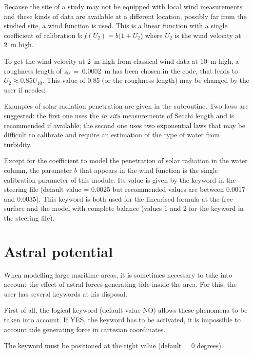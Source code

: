 Because the site of a study may not be equipped with local wind measurements
and these kinds of data are available at a different location, possibly far
from the studied site, a wind function is used. This is a linear function with
a single coefficient of calibration $b:f(U_{2}) = b(1+U_{2}$) where $U_{2}$ is
the wind velocity at 2~m high.

To get the wind velocity at 2~m high from classical wind data at 10~m high, a
roughness length of ${z}_{0}~=~0.0002$~m has been chosen in the code,
that leads to $U_{2} \approx 0.85 U_{10}$. This value
of 0.85 (or the roughness length) may be changed by the user if needed.

Examples of solar radiation penetration are given in the
 subroutine. Two laws are suggested: the first one
uses the \emph{in situ} measurements of Secchi length and is
recommended if available; the second one uses two exponential laws that may be
difficult to calibrate and require an estimation of the type of water from
turbidity.

Except for the coefficient to model the penetration of solar radiation in the
water column, the parameter $b$ that appears in the wind function is the
single calibration parameter of this module. Its value is given by the keyword
in the \waqtel steering file (default
value = 0.0025 but recommended values are between 0.0017 and 0.0035). This
keyword is both used for the linearised formula at the free surface and the
model with complete balance (values 1 and 2 for the keyword
 in the \waqtel steering file).


\section{Astral potential}

When modelling large maritime areas, it is sometimes necessary to take into
account the effect of astral forces generating tide inside the area. For this,
the user has several keywords at his disposal.

First of all, the logical keyword  (default value
NO) allows these phenomena to be taken into account.
If YES, the keyword  has to be activated,
it is impossible to account tide generating force in cartesian coordinates.

The keyword  must be positioned at the right
value (default = 0 degrees).

